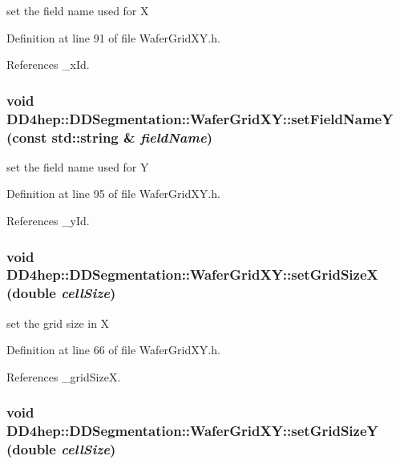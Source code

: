 set the field name used for X 

Definition at line 91 of file WaferGridXY.h.

References \_\-xId.\hypertarget{class_d_d4hep_1_1_d_d_segmentation_1_1_wafer_grid_x_y_a7ec7eba050ae07e10694ff0666a10d35}{
\subsubsection[{setFieldNameY}]{\setlength{\rightskip}{0pt plus 5cm}void DD4hep::DDSegmentation::WaferGridXY::setFieldNameY (const std::string \& {\em fieldName})}}
\label{class_d_d4hep_1_1_d_d_segmentation_1_1_wafer_grid_x_y_a7ec7eba050ae07e10694ff0666a10d35}


set the field name used for Y 

Definition at line 95 of file WaferGridXY.h.

References \_\-yId.\hypertarget{class_d_d4hep_1_1_d_d_segmentation_1_1_wafer_grid_x_y_a890894a5afd02db5c888fba69c5489d7}{
\subsubsection[{setGridSizeX}]{\setlength{\rightskip}{0pt plus 5cm}void DD4hep::DDSegmentation::WaferGridXY::setGridSizeX (double {\em cellSize})}}
\label{class_d_d4hep_1_1_d_d_segmentation_1_1_wafer_grid_x_y_a890894a5afd02db5c888fba69c5489d7}


set the grid size in X 

Definition at line 66 of file WaferGridXY.h.

References \_\-gridSizeX.\hypertarget{class_d_d4hep_1_1_d_d_segmentation_1_1_wafer_grid_x_y_a8330f514334f70de9b381170c3bcf8ef}{
\subsubsection[{setGridSizeY}]{\setlength{\rightskip}{0pt plus 5cm}void DD4hep::DDSegmentation::WaferGridXY::setGridSizeY (double {\em cellSize})}}
\label{class_d_d4hep_1_1_d_d_segmentation_1_1_wafer_grid_x_y_a8330f514334f70de9b381170c3bcf8ef}


